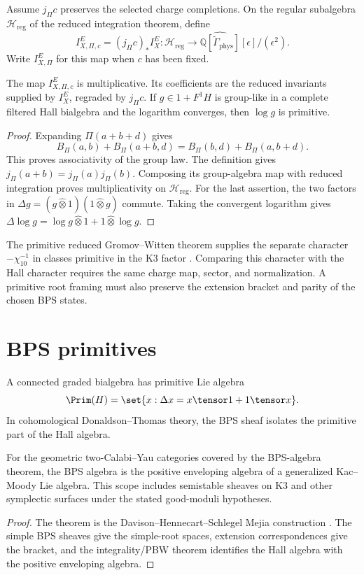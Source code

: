 Assume $j_\Pi c$ preserves the selected charge completions.
On the regular subalgebra $\mathcal H_{\mathrm{reg}}$ of the reduced
integration theorem, define
\[
 I_{X,\Pi,c}^E=(j_\Pi c)_*I_X^E:
 \mathcal H_{\mathrm{reg}}\longrightarrow
 \widehat{\mathbb Q[\widetilde\Gamma_{\mathrm{phys}}]}
 [\epsilon]/(\epsilon^2).
\]
Write $I_{X,\Pi}^E$ for this map when $c$ has been fixed.

\begin{proposition}\label{cyiv:polarized-character}
The map $I_{X,\Pi,c}^E$ is multiplicative.
Its coefficients are the reduced invariants supplied by $I_X^E$,
regraded by $j_\Pi c$.
If $g\in1+F^1H$ is group-like in a complete filtered Hall bialgebra
and the logarithm converges, then $\log g$ is primitive.
\end{proposition}
\begin{proof}
Expanding $\Pi(a+b+d)$ gives
\[
 B_\Pi(a,b)+B_\Pi(a+b,d)=B_\Pi(b,d)+B_\Pi(a,b+d).
\]
This proves associativity of the group law.
The definition gives $j_\Pi(a+b)=j_\Pi(a)j_\Pi(b)$.
Composing its group-algebra map with reduced integration proves
multiplicativity on $\mathcal H_{\mathrm{reg}}$.
For the last assertion, the two factors in
$\Delta g=(g\widehat\otimes1)(1\widehat\otimes g)$ commute.
Taking the convergent logarithm gives
$\Delta\log g=\log g\widehat\otimes1+1\widehat\otimes\log g$.
\end{proof}

The primitive reduced Gromov--Witten theorem supplies the separate
character $-\chi_{10}^{-1}$ in classes primitive in the K3 factor
\cite{OP}.
Comparing this character with the Hall character requires the same
charge map, sector, and normalization.
A primitive root framing must also preserve the extension bracket
and parity of the chosen BPS states.

\chapter{BPS primitives}
A connected graded bialgebra has primitive Lie algebra
\[
 \Prim(H)=\set{x:\Delta x=x\tensor1+1\tensor x}.
\]
In cohomological Donaldson--Thomas theory, the BPS sheaf isolates the primitive part of the Hall algebra.

\begin{theorem}
For the geometric two-Calabi--Yau categories covered by the BPS-algebra theorem, the BPS algebra is the positive enveloping algebra of a generalized Kac--Moody Lie algebra. This scope includes semistable sheaves on K3 and other symplectic surfaces under the stated good-moduli hypotheses.
\end{theorem}
\begin{proof}
The theorem is the Davison--Hennecart--Schlegel Mejia construction \cite{DHS}. The simple BPS sheaves give the simple-root spaces, extension correspondences give the bracket, and the integrality/PBW theorem identifies the Hall algebra with the positive enveloping algebra.
\end{proof}

